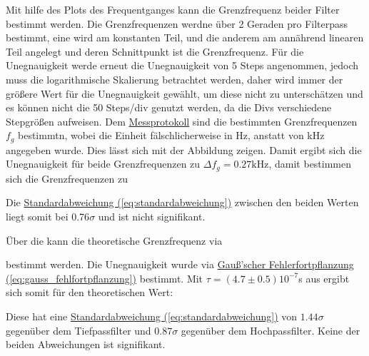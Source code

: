 Mit hilfe des Plots des Frequentganges kann die Grenzfrequenz beider Filter bestimmt werden. Die Grenzfrequenzen werdne über 2 Geraden pro Filterpass bestimmt, eine wird am konstanten Teil, und die anderem am annährend linearen Teil angelegt und deren Schnittpunkt ist die Grenzfrequenz. Für die Unegnauigkeit werde erneut die Unegnauigkeit von 5 Steps angenommen, jedoch muss die logarithmische Skalierung betrachtet werden, daher wird immer der größere Wert für die Unegnauigkeit gewählt, um diese nicht zu unterschätzen und es können nicht die 50 Steps/div genutzt werden, da die Divs verschiedene Stepgrößen aufweisen.
Dem \hyperref[ch:Protokoll]{Messprotokoll} sind die bestimmten Grenzfrequenzen $f_g$ bestimmtn, wobei die Einheit fälschlicherweise in Hz, anstatt von kHz angegeben wurde. Dies lässt sich mit der Abbildung zeigen. 
Damit ergibt sich die Unegnauigkeit für beide Grenzfrequenzen zu $\Delta f_g = 0.27 \mathrm{kHz}$, damit bestimmen sich die Grenzfrequenzen zu


Die \hyperref[eq:standardabweichung]{Standardabweichung (\ref*{eq:standardabweichung})} zwischen den beiden Werten liegt somit bei 0.76$\sigma$ und ist nicht signifikant.

Über die  kann die theoretische Grenzfrequenz via 

bestimmt werden. Die Unegnauigkeit wurde via \hyperref[eq:gauss_fehlfortpflanzung]{Gauß'scher Fehlerfortpflanzung (\ref*{eq:gauss_fehlfortpflanzung})} bestimmt. Mit $\tau = (4.7 \pm 0.5) 10^{-7}$s aus  ergibt sich somit für den theoretischen Wert:

Diese hat eine \hyperref[eq:standardabweichung]{Standardabweichung (\ref*{eq:standardabweichung})} von $1.44 \sigma$ gegenüber dem Tiefpassfilter und $0.87 \sigma$ gegenüber dem Hochpassfilter. Keine der beiden Abweichungen ist signifikant.




